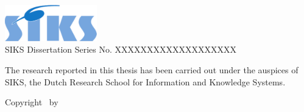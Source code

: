 \thispagestyle{empty}

\begin{addmargin}[-3cm]{1cm}
\vfill

\includegraphics[width=4cm]{front_back_matter/imgs/siks.pdf}\\
SIKS Dissertation Series No. XXXXXXXXXXXXXXXXXXX\bigskip
  

\noindent The research reported in this thesis has been carried out under the auspices of SIKS, the Dutch Research School for Information and Knowledge Systems.\bigskip\bigskip

\vfill
Copyright \textcopyright\ \myTime by \myName
\end{addmargin}